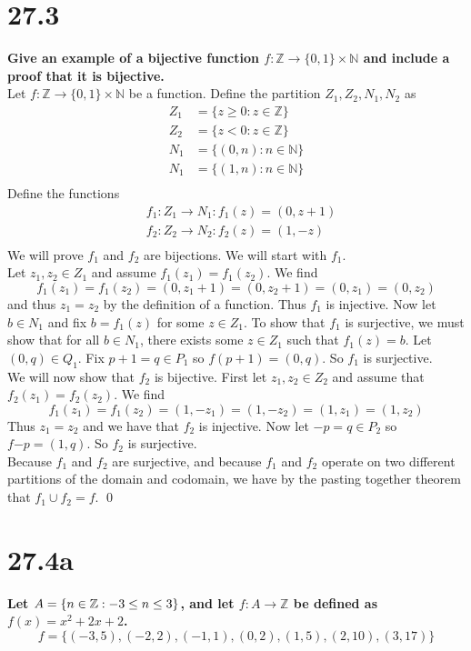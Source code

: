 \documentclass{article}
\begin{document}
\section*{27.3}
\textbf{Give an example of a bijective function $f: \mathbb{Z} \rightarrow \{0, 1\} \times \mathbb{N}$ and include a proof that it is bijective.}\\
\proof Let $f: \mathbb{Z} \rightarrow \{0, 1\} \times \mathbb{N}$ be a function. Define the partition $Z_1, Z_2, N_1, N_2$ as
\begin{align*}
    Z_1 &= \{ z \geq 0 : z \in \mathbb{Z}\}\\
    Z_2 &= \{ z < 0 : z \in \mathbb{Z}\}\\
    N_1 &= \{(0,n) : n \in \mathbb{N}\}\\
    N_1 &= \{(1,n) : n \in \mathbb{N}\}\\
\end{align*}
Define the functions
\begin{align*}
    &f_1: Z_1 \rightarrow N_1 : f_1(z) = (0, z + 1)\\
    &f_2: Z_2 \rightarrow N_2 : f_2(z) = (1, -z)\\
\end{align*}
We will prove $f_1$ and $f_2$ are bijections. We will start with $f_1$.\\
Let $z_1, z_2 \in Z_1$ and assume $f_1(z_1) = f_1(z_2)$. We find
\[
f_1(z_1) = f_1(z_2) = (0, z_1 + 1) = (0, z_2 + 1) = (0, z_1) = (0, z_2)
\]
and thus $z_1 = z_2$ by the definition of a function. Thus $f_1$ is injective. Now let $b \in N_1$ and fix $b = f_1(z)$ for some $z \in Z_1$. To show that $f_1$ is surjective, we must show that for all $b \in N_1$, there exists some $z \in Z_1$ such that $f_1(z) = b$. Let $(0, q) \in Q_1$. Fix $p + 1 = q \in P_1$ so $f(p+1) = (0, q)$. So $f_1$ is surjective.\\
We will now show that $f_2$ is bijective. First let $z_1, z_2 \in Z_2$ and assume that $f_2(z_1) = f_2(z_2)$. We find
\[
f_1(z_1) = f_1(z_2) = (1, -z_1) = (1, -z_2) = (1, z_1) = (1, z_2)
\]
Thus $z_1 = z_2$ and we have that $f_2$ is injective. Now let $-p = q \in P_2$ so $f{-p} = (1, q)$. So $f_2$ is surjective.\\
Because $f_1$ and $f_2$ are surjective, and because $f_1$ and $f_2$ operate on two different partitions of the domain and codomain, we have by the pasting together theorem that $f_1 \cup f_2 = f$. \qed
\section*{27.4a}
\textbf{Let $A = \{n \in \mathbb{Z} : -3 \leq n \leq 3\}$, and let $f: A \rightarrow \mathbb{Z}$ be defined as $f(x) = x^2 + 2x + 2$.}\\
\[
f = \{(-3, 5), (-2, 2), (-1, 1), (0, 2), (1, 5), (2, 10), (3, 17)\}
\]
\end{document}
